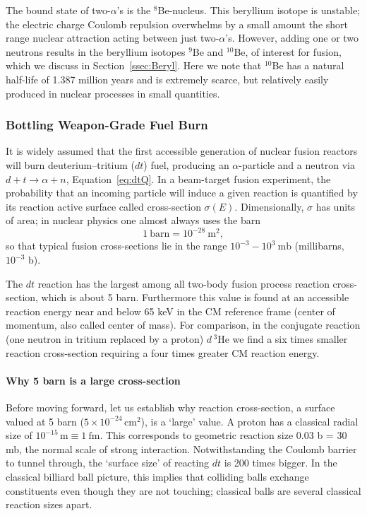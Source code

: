 \documentclass[particles,article,accept,pdftex,moreauthors]{Definitions/mdpi}
\begin{document}
The bound state of two-$\alpha$'s is the ${}^8$Be-nucleus. This beryllium isotope is unstable; the electric charge Coulomb repulsion overwhelms by a small amount the short range nuclear attraction acting between just two-$\alpha$'s. However, adding one or two neutrons results in the beryllium isotopes ${}^9$Be and ${}^{10}$Be, of interest for fusion, which we discuss in Section~\ref{ssec:Beryl}. Here we note that ${}^{10}$Be has a natural half-life of 1.387 million years and is extremely scarce, but relatively easily produced in nuclear processes in small quantities.

\subsubsection{Bottling Weapon-Grade Fuel Burn}\label{sssec:bottleHBomb}
It is widely assumed that the first accessible generation of nuclear fusion reactors will burn deuterium--tritium ($dt$) fuel, producing an $\alpha$-particle and a neutron via $d+t\to \alpha +n$, Equation~\eqref{eq:dtQ}. In a beam-target fusion experiment, the probability that an incoming particle will induce a given reaction is quantified by its reaction active surface called cross-section $\sigma(E)$. Dimensionally, $\sigma$ has units of area; in nuclear physics one almost always uses the barn
\[
1\ \mathrm{barn} = 10^{-28}\ \mathrm{m}^2,
\]
so that typical fusion cross-sections lie in the range $10^{-3}-10^3\ \mathrm{mb}$ (millibarns, $10^{-3}$ b).

The $dt$ reaction has the largest among all two-body fusion process reaction cross-section, which is about 5 barn. Furthermore this value is found at an accessible reaction energy near and below 65 keV in the CM reference frame (center of momentum, also called center of mass). For comparison, in the conjugate reaction (one neutron in tritium replaced by a proton) $d\,{}^{3}\mathrm{He}$ we find a six times smaller reaction cross-section requiring a four times greater CM reaction energy.

\paragraph*{\bf Why 5 barn is a large cross-section}
Before moving forward, let us establish why reaction cross-section, a surface valued at 5 barn ($5\times 10^{-24}\,\mathrm{cm}^2$), is a `large' value. A proton has a classical radial size of $10^{-15}\,\mathrm{m}\equiv 1~\mathrm{fm}$. This corresponds to geometric reaction size 0.03 b = 30 mb, the normal scale of strong interaction. Notwithstanding the Coulomb barrier to tunnel through, the `surface size' of reacting $dt$ is 200 times bigger. In the classical billiard ball picture, this implies that colliding balls exchange constituents even though they are not touching; classical balls are several classical reaction sizes apart. 
\end{document}
